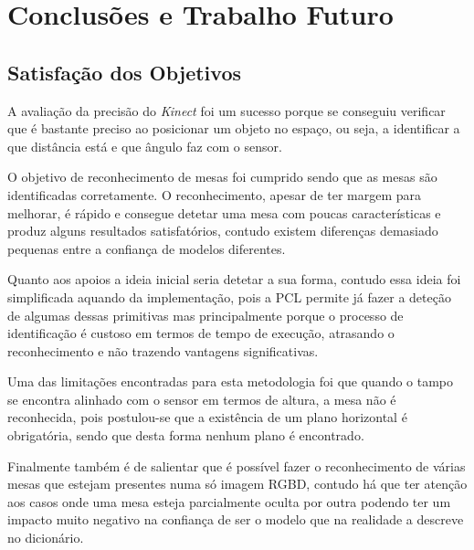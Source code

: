 \chapter{Conclusões e Trabalho Futuro} \label{chap:concl}

\section*{}



\section{Satisfação dos Objetivos}

A avaliação da precisão do \emph{Kinect} foi um sucesso porque se conseguiu verificar que é bastante preciso ao posicionar um objeto no espaço, ou seja, a identificar a que distância está e que ângulo faz com o sensor.

O objetivo de reconhecimento de mesas foi cumprido sendo que as mesas são identificadas corretamente. O reconhecimento, apesar de ter margem para melhorar, é rápido e consegue detetar uma mesa com poucas características e produz alguns resultados satisfatórios, contudo existem diferenças demasiado pequenas entre a confiança de modelos diferentes.

Quanto aos apoios a ideia inicial seria detetar a sua forma, contudo essa ideia foi simplificada aquando da implementação, pois a PCL permite já fazer a deteção de algumas dessas primitivas mas principalmente porque o processo de identificação é custoso em termos de tempo de execução, atrasando o reconhecimento e não trazendo vantagens significativas.

Uma das limitações encontradas para esta metodologia foi que quando o tampo se encontra alinhado com o sensor em termos de altura, a mesa não é reconhecida, pois postulou-se que a existência de um plano horizontal é obrigatória, sendo que desta forma nenhum plano é encontrado.

Finalmente também é de salientar que é possível fazer o reconhecimento de várias mesas que estejam presentes numa só imagem RGBD, contudo há que ter atenção aos casos onde uma mesa esteja  parcialmente oculta por outra podendo ter um impacto muito negativo na confiança de ser o modelo que na realidade a descreve no dicionário.

